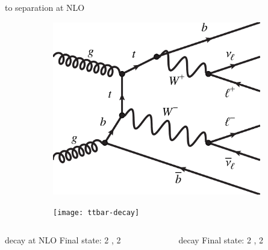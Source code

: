\begin{frame}{\tW to \ttbar separation at NLO}
    \begin{figure}[htbp]
    \centering
    \begin{subfigure}[b]{0.44\textwidth}
        \includegraphics[width=\textwidth]{feynman_diagrams/tw-NLO.pdf}
        \label{fig:nlo:ttbar}
    \end{subfigure}
\quad
    \begin{subfigure}[b]{0.44\textwidth}
        \texttt{[image: ttbar-decay]}
        \label{fig:nlo:tw}
    \end{subfigure}
\end{figure}
%
\begin{columns}
\quad
    \begin{column}{0.45\textwidth}
    \begin{block}{\tW decay at NLO}
    Final state: 2 \PW, 2 \Pbottom
    \end{block}
    \end{column}
    \quad
    \begin{column}{0.45\textwidth}
    \begin{block}{\ttbar decay}
    Final state: 2 \PW, 2 \Pbottom
    \end{block}
    \end{column}
\quad
\end{columns}
\end{frame}
